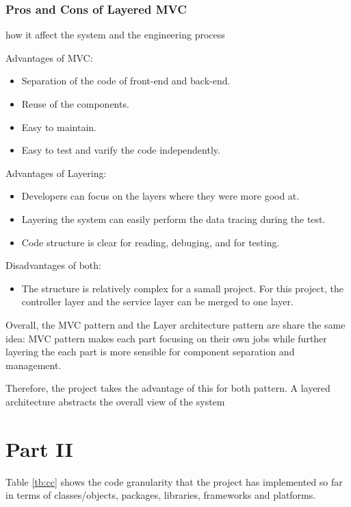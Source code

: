 \documentclass[conference]{IEEEtran}
\begin{document}
\subsubsection{\textbf{Pros and Cons of Layered MVC}} how it affect the system and the engineering process

Advantages of MVC:
\begin{itemize}
	\item Separation of the code of front-end and back-end.
	\item Reuse of the components.
	\item Easy to maintain.
	\item Easy to test and varify the code independently.
\end{itemize}

Advantages of Layering:

\begin{itemize}
	\item Developers can focus on the layers where they were more good at.
	\item Layering the system can easily perform the data tracing during the test.
	\item Code structure is clear for reading, debuging, and for testing.
\end{itemize}

Disadvantages of both:
\begin{itemize}
	\item The structure is relatively complex for a samall project.
	      For this project, the controller layer and the service layer can be merged to one layer.
\end{itemize}

Overall, the MVC pattern and the Layer architecture pattern are share the same idea:
MVC pattern makes each part focusing on their own jobs while further layering the each part is more sensible for component separation and management.

Therefore, the project takes the advantage of this for both pattern.
A layered architecture abstracts the overall view of the system

\section{Part II}

Table \ref{tb:cc} shows the code granularity that the project has implemented so far in terms of classes/objects, packages,
libraries, frameworks and platforms.
\end{document}
